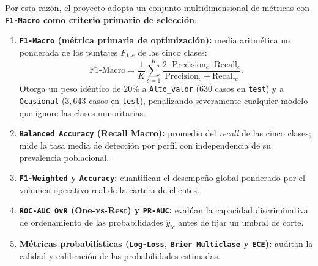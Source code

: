 \documentclass[11pt,a4paper]{article}
\newcommand{\code}[1]{\texttt{\small #1}}
\begin{document}
Por esta razón, el proyecto adopta un conjunto multidimensional de métricas con \textbf{\code{F1-Macro} como criterio primario de selección}:
\begin{enumerate}[noitemsep]
    \item \textbf{\code{F1-Macro} (métrica primaria de optimización):} media aritmética no ponderada de los puntajes $F_{1,c}$ de las cinco clases:
    \begin{equation}
        \text{F1-Macro} = \frac{1}{K}\sum_{c=1}^{K} \frac{2 \cdot \text{Precision}_c \cdot \text{Recall}_c}{\text{Precision}_c + \text{Recall}_c}.
    \end{equation}
    Otorga un peso idéntico de $20\%$ a \code{Alto\_valor} ($630$ casos en \code{test}) y a \code{Ocasional} ($3{,}643$ casos en \code{test}), penalizando severamente cualquier modelo que ignore las clases minoritarias.
    \item \textbf{\code{Balanced Accuracy} (Recall Macro):} promedio del \textit{recall} de las cinco clases; mide la tasa media de detección por perfil con independencia de su prevalencia poblacional.
    \item \textbf{\code{F1-Weighted} y \code{Accuracy}:} cuantifican el desempeño global ponderado por el volumen operativo real de la cartera de clientes.
    \item \textbf{\code{ROC-AUC OvR} (One-vs-Rest) y \code{PR-AUC}:} evalúan la capacidad discriminativa de ordenamiento de las probabilidades $\hat{y}_{ic}$ antes de fijar un umbral de corte.
    \item \textbf{Métricas probabilísticas (\code{Log-Loss}, \code{Brier Multiclase} y \code{ECE}):} auditan la calidad y calibración de las probabilidades estimadas.
\end{enumerate}
\end{document}
